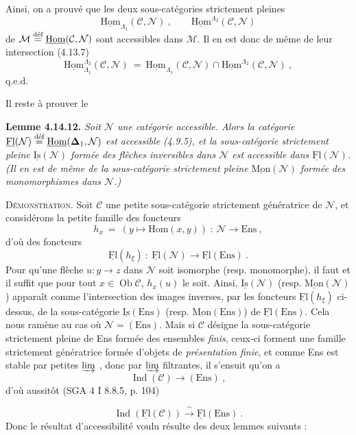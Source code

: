 \documentclass[11pt]{article}
\newcommand{\printedpage}[1]{\marginpar{\footnotesize p.~#1}}
\newcommand{\msp}[1]{\marginpar{\footnotesize [#1]}}
\newcommand{\uHom}{\underline{\mathrm{Hom}}}
\newcommand{\uFl}{\underline{\mathrm{Fl}}}
\newcommand{\uIs}{\underline{\mathrm{Is}}}
\newcommand{\uMon}{\underline{\mathrm{Mon}}}
\newcommand{\defeq}{\overset{\textup{déf}}{=}}
\newcommand{\Ob}{\operatorname{Ob}}
\newcommand{\Ind}{\operatorname{Ind}}
\newcommand{\Ens}{\mathrm{Ens}}
\begin{document}
\msp{page 384}
Ainsi, on a prouvé que les deux sous-catégories strictement pleines
\[
\uHom_{\Lambda_1}(\mathcal{C},\mathcal{N}) \ , \qquad \uHom^{\Lambda_2}(\mathcal{C},\mathcal{N})
\]
de $\mathcal{M} \defeq \uHom(\mathcal{C},\mathcal{N})$ sont accessibles dans $\mathcal{M}$. Il en est donc de même de leur intersection (4.13.7)
\[
\uHom^{\Lambda_2}_{\Lambda_1}(\mathcal{C},\mathcal{N}) \ = \ \uHom_{\Lambda_1}(\mathcal{C},\mathcal{N}) \cap \uHom^{\Lambda_2}(\mathcal{C},\mathcal{N}) \ ,
\]
q.e.d.

Il reste à prouver le

\textbf{Lemme 4.14.12.} \textit{Soit $\mathcal{N}$ une catégorie accessible. Alors la catégorie $\uFl(\mathcal{N}) \defeq \uHom(\boldsymbol{\Delta}_1,\mathcal{N})$ est accessible (4.9.5), et la sous-catégorie strictement pleine $\uIs(\mathcal{N})$ formée des flèches inversibles dans $\mathcal{N}$ est accessible dans $\uFl(\mathcal{N})$. (Il en est de même de la sous-catégorie strictement pleine $\uMon(\mathcal{N})$ formée des monomorphismes dans $\mathcal{N}$.)}

\textsc{Démonstration}. Soit $\mathcal{C}$ une petite sous-catégorie strictement génératrice de $\mathcal{N}$, et considérons la petite famille des foncteurs
\[
h_x \ = \ (y \longmapsto \mathrm{Hom}(x,y)) \ : \ \mathcal{N} \longrightarrow \Ens \ ,
\]
\printedpage{146}
\msp{page 385}
d'où des foncteurs
\[
\uFl(h_\xi) \ : \ \uFl(\mathcal{N}) \longrightarrow \uFl(\Ens) \ . %
\]
Pour qu'une flèche $u : y \longrightarrow z$ dans $\mathcal{N}$ soit isomorphe (resp. monomorphe), il faut et il suffit que pour tout $x \in \Ob\mathcal{C}$, $h_x(u)$ le soit. Ainsi, $\uIs(\mathcal{N})$ (resp. $\uMon(\mathcal{N})$) apparaît comme l'intersection des images inverses, par les foncteurs $\uFl(h_\xi)$ ci-dessus, de la sous-catégorie $\uIs(\Ens)$ (resp. $\uMon(\Ens)$) de $\uFl(\Ens)$. Cela nous ramène au cas où $\mathcal{N} = (\Ens)$. Mais si $\mathcal{C}$ désigne la sous-catégorie strictement pleine de Ens formée des ensembles \textit{finis}, ceux-ci forment une famille strictement génératrice formée d'objets de \textit{présentation finie}, et comme Ens est stable par petites $\varinjlim$ , donc par $\varinjlim$ filtrantes, il s'ensuit qu'on a %
\[
\Ind(\mathcal{C}) \longrightarrow (\Ens) \ , \tag*{$(*)$}
\]
d'où aussitôt (SGA 4 I 8.8.5, p. 104)

\msp{page 386}
\[
\Ind(\uFl(\mathcal{C})) \xrightarrow{\ \sim\ } \uFl(\Ens) \ . \tag*{$(*)$}
\]
Donc le résultat d'accessibilité voulu résulte des deux lemmes suivants :
\end{document}
